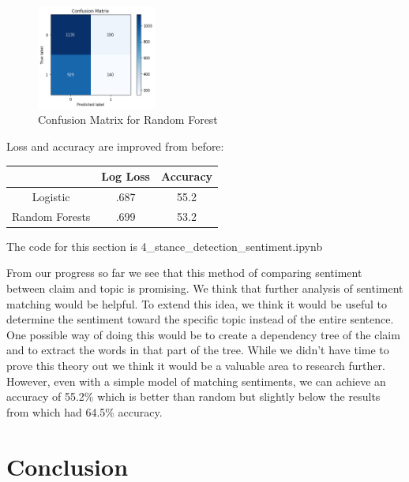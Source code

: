 \documentclass[11pt,a4paper]{article}
\begin{document}
\begin{figure}[H]
    \centering
    \includegraphics[width=0.35\textwidth]{sentiment_rf}
    \caption{\label{font-table} Confusion Matrix for Random Forest }
\end{figure} 

Loss and accuracy are improved from before:

\begin{table}[H]
\begin{center}
\begin{tabular}{|c|c|c|}
\hline \bf & \bf Log Loss & \bf Accuracy \\ \hline
Logistic & .687 & 55.2 \\
Random Forests & .699 & 53.2 \\
\hline
\end{tabular}
\end{center}
\end{table}
The code for this section is 4\_stance\_detection\_sentiment.ipynb

From our progress so far we see that this method of comparing sentiment between claim and topic is promising.  We think that further analysis of sentiment matching would be helpful.  To extend this idea, we think it would be useful to determine the sentiment toward the specific topic instead of the entire sentence.  One possible way of doing this would be to create a dependency tree of the claim and to extract the words in that part of the tree.  While we didn't have time to prove this theory out we think it would be a valuable area to research further.  However, even with a simple model of matching sentiments, we can achieve an accuracy of 55.2\% which is better than random but slightly below the results from \cite{bar2017stance} which had 64.5\% accuracy.

\section{Conclusion}


%
%


\end{document}
